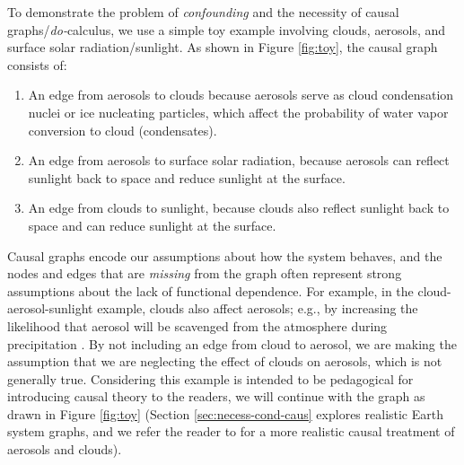 \documentclass[12pt]{article}
\begin{document}
To demonstrate the problem of \textit{confounding} and the necessity
of causal graphs/\textit{do-}calculus, we use a simple toy
example involving clouds, aerosols, and surface solar
radiation/sunlight. As shown in Figure \ref{fig:toy}, the causal
graph consists of:

\begin{enumerate}
\item An edge from aerosols to clouds because aerosols serve as cloud
  condensation nuclei or ice nucleating particles, which affect the probability of water vapor conversion to cloud (condensates).
\item An edge from aerosols to surface solar radiation, because
  aerosols can reflect sunlight back to space and reduce sunlight at
  the surface.
\item An edge from clouds to sunlight, because clouds also reflect
  sunlight back to space and can reduce sunlight at the surface.
\end{enumerate}

Causal graphs encode our assumptions about how the system behaves, and
the nodes and edges that are \textit{missing} from the graph often
represent strong assumptions about the lack of functional
dependence. For example, in the cloud-aerosol-sunlight example, clouds
also affect aerosols; e.g., by increasing the likelihood that aerosol
will be scavenged from the atmosphere during precipitation
\citep[e.g.,][]{radke-scavenge-1980, jurado2008,
  blanco-alegre2018}. By not including an edge from cloud to aerosol,
we are making the assumption that we are neglecting the effect of
clouds on aerosols, which is not generally true. Considering this
example is intended to be pedagogical for introducing causal theory to
the readers, we will continue with the graph as drawn in Figure
\ref{fig:toy} (Section \ref{sec:necess-cond-caus} explores realistic
Earth system graphs, and we refer the reader to \cite{gryspeerdt-2019}
for a more realistic causal treatment of aerosols and clouds).

\end{document}
